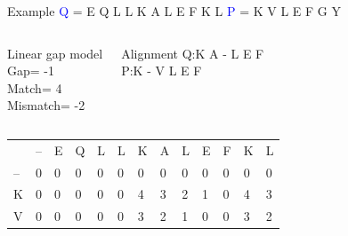 \documentclass{bredelebeamer}
\begin{document}
\begin{frame}{Example}
 \centering
 \textcolor{blue}{Q} = E Q L L K A L E F K L \quad \textcolor{blue}{P} = K V L E F G Y
\begin{columns}
\begin{block}{Linear gap model} \\
Gap= -1 \\
Match= 4 \\
Mismatch= -2
\end{block}
\begin{block}{Alignment}
Q:\quad K A - L E F \\
P:\quad K - V L E F
\end{block}
\end{columns}

\begin{table}[]
\centering
\begin{tabular}{*{13}{p{0.4cm}}}
                        & --                     & E                      & Q                      & L                      & L                      & \cellcolor[HTML]{FFFF00}K                      & A                      & L                      &E                       & F                                               & K                       & L                       \\ \cline{2-13} 
\multicolumn{1}{l|}{--} & \multicolumn{1}{l|}{0} & \multicolumn{1}{l|}{0} & \multicolumn{1}{l|}{0} & \multicolumn{1}{l|}{0} & \multicolumn{1}{l|}{0} & \multicolumn{1}{l|}{0} & \multicolumn{1}{l|}{0} & \multicolumn{1}{l|}{0} & \multicolumn{1}{l|}{0}  & \multicolumn{1}{l|}{0}                          & \multicolumn{1}{l|}{0}  & \multicolumn{1}{l|}{0}  \\ \cline{2-13} 
\multicolumn{1}{l|}{\cellcolor[HTML]{FFFF00}K}  & \multicolumn{1}{l|}{0} & \multicolumn{1}{l|}{0} & \multicolumn{1}{l|}{0} & \multicolumn{1}{l|}{0} & \multicolumn{1}{l|}{0} & \multicolumn{1}{l|}{\cellcolor[HTML]{00FF00}4} & \multicolumn{1}{l|}{\cellcolor[HTML]{00FF00}3} & \multicolumn{1}{l|}{2} & \multicolumn{1}{l|}{1}  & \multicolumn{1}{l|}{0}                          & \multicolumn{1}{l|}{4}  & \multicolumn{1}{l|}{3}  \\ \cline{2-13}  %
\multicolumn{1}{l|}{V}  & \multicolumn{1}{l|}{0} & \multicolumn{1}{l|}{0} & \multicolumn{1}{l|}{0} & \multicolumn{1}{l|}{0} & \multicolumn{1}{l|}{0} & \multicolumn{1}{l|}{3} & \multicolumn{1}{l|}{\cellcolor[HTML]{00FF00}2} & \multicolumn{1}{l|}{1} & \multicolumn{1}{l|}{0}  & \multicolumn{1}{l|}{0}                          & \multicolumn{1}{l|}{3}  & \multicolumn{1}{l|}{2}  \\ \cline{2-13} 

\end{tabular}
\end{table}
\end{frame}
\end{document}
